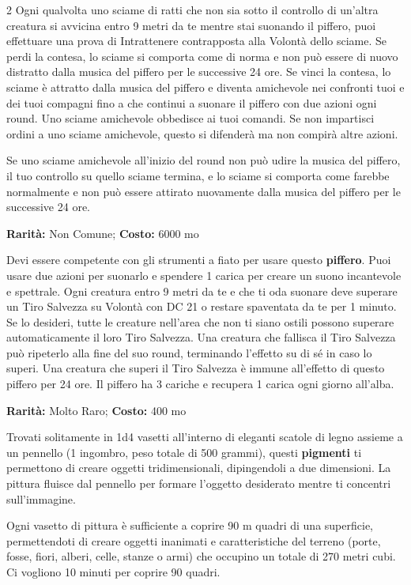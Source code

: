 \begin{multicols}{2}
Ogni qualvolta uno sciame di ratti che non sia sotto il controllo di un'altra creatura si avvicina entro 9 metri da te mentre stai suonando il piffero, puoi effettuare una prova di Intrattenere contrapposta alla Volontà dello sciame. Se perdi la contesa, lo sciame si comporta come di norma e non può essere di nuovo distratto dalla musica del piffero per le successive 24 ore. Se vinci la contesa, lo sciame è attratto dalla musica del piffero e diventa amichevole nei confronti tuoi e dei tuoi compagni fino a che continui a suonare il piffero con due azioni ogni round. Uno sciame amichevole obbedisce ai tuoi comandi. Se non impartisci ordini a uno sciame amichevole, questo si difenderà ma non compirà altre azioni.

Se uno sciame amichevole all'inizio del round non può udire la musica del piffero, il tuo controllo su quello sciame termina, e lo sciame si comporta come farebbe normalmente e non può essere attirato nuovamente dalla musica del piffero per le successive 24 ore.


\textbf{Rarità:} Non Comune; \textbf{Costo:} 6000 mo

Devi essere competente con gli strumenti a fiato per usare questo \textbf{piffero}. Puoi usare due azioni per suonarlo e spendere 1 carica per creare un suono incantevole e spettrale. Ogni creatura entro 9 metri da te e che ti oda suonare deve superare un Tiro Salvezza su Volontà con DC 21 o restare spaventata da te per 1 minuto. Se lo desideri, tutte le creature nell'area che non ti siano ostili possono superare automaticamente il loro Tiro Salvezza. Una creatura che fallisca il Tiro Salvezza può ripeterlo alla fine del suo round, terminando l'effetto su di sé in caso lo superi. Una creatura che superi il Tiro Salvezza è immune all'effetto di questo piffero per 24 ore. Il piffero ha 3 cariche e recupera 1 carica ogni giorno all'alba.


\textbf{Rarità:} Molto Raro; \textbf{Costo:} 400 mo

Trovati solitamente in 1d4 vasetti all'interno di eleganti scatole di legno assieme a un pennello (1 ingombro, peso totale di 500 grammi), questi \textbf{pigmenti} ti permettono di creare oggetti tridimensionali, dipingendoli a due dimensioni. La pittura fluisce dal pennello per formare l'oggetto desiderato mentre ti concentri sull'immagine.

Ogni vasetto di pittura è sufficiente a coprire 90 m quadri di una superficie, permettendoti di creare oggetti inanimati e caratteristiche del terreno (porte, fosse, fiori, alberi, celle, stanze o armi) che occupino un totale di 270 metri cubi. Ci vogliono 10 minuti per coprire 90 quadri.


\end{multicols}

